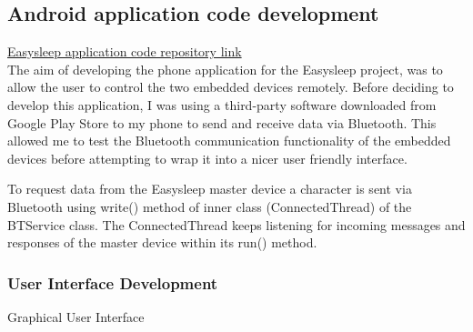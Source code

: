 \documentclass[12pt,a4paper]{article}
\begin{document}
    \subsection{Android application code development}
    \href{https://github.com/zedd-1983/Easysleep_app/tree/bt_connection_3}{Easysleep application code repository link}\\
    
    The aim of developing the phone application for the Easysleep project, was to allow the user to control the two embedded devices remotely. Before deciding to develop this application, I was using a third-party software downloaded from Google Play Store to my phone to send and receive data via Bluetooth. This allowed me to test the Bluetooth communication functionality of the embedded devices before attempting to wrap it into a nicer user friendly interface.
    
    To request data from the Easysleep master device a character is sent via Bluetooth using write() method of inner class (ConnectedThread) of the BTService class. The ConnectedThread keeps listening for incoming messages and responses of the master device within its run() method. 
                
    \subsubsection{User Interface Development}
    Graphical User Interface\\
    
\end{document}
